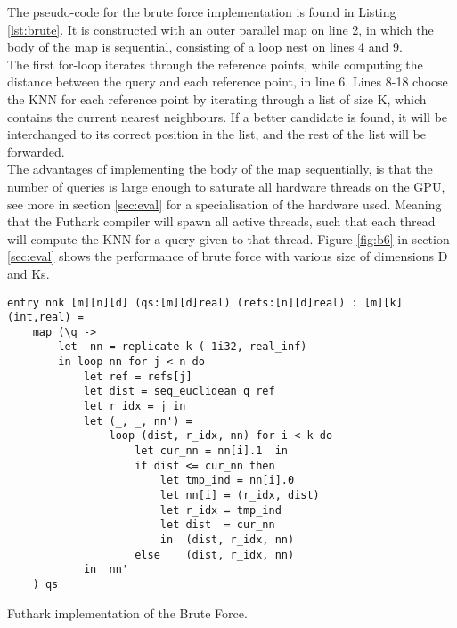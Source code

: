 


The pseudo-code for the brute force implementation is found in Listing \ref{lst:brute}. It is constructed with an outer parallel map on line 2, in which the body of the map is sequential, consisting of a loop nest on lines 4 and 9.
\\[2mm]
The first for-loop iterates through the reference points, while computing the distance between the query and each reference point, in line 6. Lines 8-18 choose the KNN for each reference point by iterating through a list of size K, which contains the current nearest neighbours. If a better candidate is found, it will be interchanged to its correct position in the list, and the rest of the list will be forwarded.
\\[2mm]
The advantages of implementing the body of the map sequentially, is that the number of queries is large enough to saturate all hardware threads on the GPU, see more in section \ref{sec:eval} for a specialisation of the hardware used. Meaning that the Futhark compiler will spawn all active threads, such that each thread will compute the KNN for a query given to that thread. Figure \ref{fig:b6} in section \ref{sec:eval} shows the performance of brute force with various size of dimensions D and Ks. 

\begin{listing}[H]
\begin{verbatim}
entry nnk [m][n][d] (qs:[m][d]real) (refs:[n][d]real) : [m][k](int,real) =
    map (\q ->
        let  nn = replicate k (-1i32, real_inf)
        in loop nn for j < n do
            let ref = refs[j]
            let dist = seq_euclidean q ref
            let r_idx = j in
            let (_, _, nn') =
                loop (dist, r_idx, nn) for i < k do
                    let cur_nn = nn[i].1  in
                    if dist <= cur_nn then 
                        let tmp_ind = nn[i].0
                        let nn[i] = (r_idx, dist)
                        let r_idx = tmp_ind
                        let dist  = cur_nn
                        in  (dist, r_idx, nn)
                    else    (dist, r_idx, nn)
            in  nn'
    ) qs
\end{verbatim}
\caption{Futhark implementation of the Brute Force.}
\label{lst:brute}
\end{listing}


